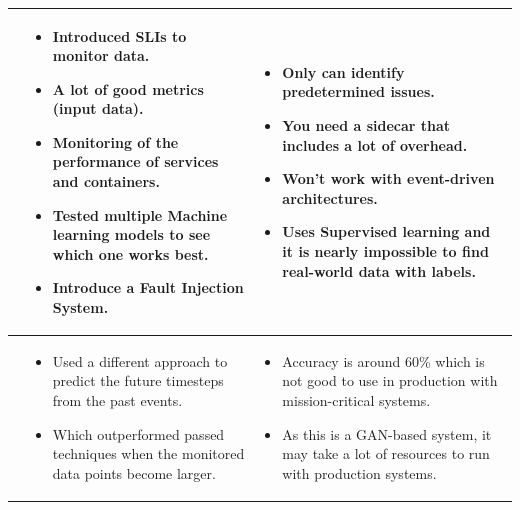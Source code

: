 \begin{longtable}{| p{25mm} | p{62mm} | p{62mm} |}
    \cite{du2018anomaly} &
    \vspace{-8mm}
    \begin{itemize}[leftmargin=3mm,noitemsep,nolistsep] 
        \item Introduced SLIs to monitor data.
        \item A lot of good metrics (input data).
        \item Monitoring of the performance of services and containers.
        \item Tested multiple Machine learning models to see which one works best.
        \item Introduce a Fault Injection System.
        \vspace{-7mm}
    \end{itemize} &
    \vspace{-8mm}
    \begin{itemize}[leftmargin=3mm,noitemsep,nolistsep] 
        \item Only can identify predetermined issues.
        \item You need a sidecar that includes a lot of overhead.
        \item Won't work with event-driven architectures.
        \item Uses Supervised learning and it is nearly impossible to find real-world data with labels.
        \vspace{-7mm}
    \end{itemize} \\ \hline
    
    \cite{kumarage2019generative} &
    \vspace{-8mm}
    \begin{itemize}[leftmargin=3mm,noitemsep,nolistsep] 
        \item Used a different approach to predict the future timesteps from the past events.
        \item Which outperformed passed techniques when the monitored data points become larger.
        \vspace{-7mm}
    \end{itemize} &
    \vspace{-8mm}
    \begin{itemize}[leftmargin=3mm,noitemsep,nolistsep] 
        \item Accuracy is around 60\% which is not good to use in production with mission-critical systems.
        \item As this is a GAN-based system, it may take a lot of resources to run with production systems.
        \vspace{-7mm}
    \end{itemize} \\ \hline
    

\end{longtable}
